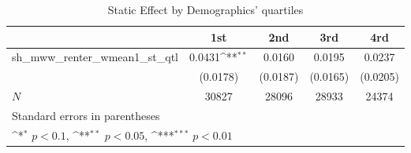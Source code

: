 \begin{table}[htbp]\centering
\def\sym#1{\ifmmode^{#1}\else\(^{#1}\)\fi}
\caption{Static Effect by Demographics' quartiles}
\begin{tabular}{l*{4}{c}}
\hline\hline
            &\multicolumn{1}{c}{1st}&\multicolumn{1}{c}{2nd}&\multicolumn{1}{c}{3rd}&\multicolumn{1}{c}{4rd}\\
\hline
sh\_mww\_renter\_wmean1\_st\_qtl&      0.0431\sym{**} &      0.0160         &      0.0195         &      0.0237         \\
            &    (0.0178)         &    (0.0187)         &    (0.0165)         &    (0.0205)         \\
\hline
\(N\)       &       30827         &       28096         &       28933         &       24374         \\
\hline\hline
\multicolumn{5}{l}{\footnotesize Standard errors in parentheses}\\
\multicolumn{5}{l}{\footnotesize \sym{*} \(p<0.1\), \sym{**} \(p<0.05\), \sym{***} \(p<0.01\)}\\
\end{tabular}
\end{table}
